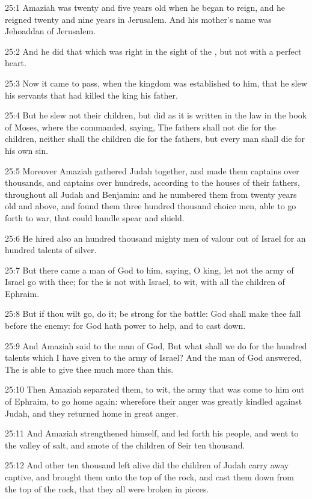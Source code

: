 25:1 Amaziah was twenty and five years old when he began to reign, and
he reigned twenty and nine years in Jerusalem. And his mother's name
was Jehoaddan of Jerusalem.

25:2 And he did that which was right in the sight of the \LORD, but not
with a perfect heart.

25:3 Now it came to pass, when the kingdom was established to him,
that he slew his servants that had killed the king his father.

25:4 But he slew not their children, but did as it is written in the
law in the book of Moses, where the \LORD commanded, saying, The
fathers shall not die for the children, neither shall the children die
for the fathers, but every man shall die for his own sin.

25:5 Moreover Amaziah gathered Judah together, and made them captains
over thousands, and captains over hundreds, according to the houses of
their fathers, throughout all Judah and Benjamin: and he numbered them
from twenty years old and above, and found them three hundred thousand
choice men, able to go forth to war, that could handle spear and
shield.

25:6 He hired also an hundred thousand mighty men of valour out of
Israel for an hundred talents of silver.

25:7 But there came a man of God to him, saying, O king, let not the
army of Israel go with thee; for the \LORD is not with Israel, to wit,
with all the children of Ephraim.

25:8 But if thou wilt go, do it; be strong for the battle: God shall
make thee fall before the enemy: for God hath power to help, and to
cast down.

25:9 And Amaziah said to the man of God, But what shall we do for the
hundred talents which I have given to the army of Israel? And the man
of God answered, The \LORD is able to give thee much more than this.

25:10 Then Amaziah separated them, to wit, the army that was come to
him out of Ephraim, to go home again: wherefore their anger was
greatly kindled against Judah, and they returned home in great anger.

25:11 And Amaziah strengthened himself, and led forth his people, and
went to the valley of salt, and smote of the children of Seir ten
thousand.

25:12 And other ten thousand left alive did the children of Judah
carry away captive, and brought them unto the top of the rock, and
cast them down from the top of the rock, that they all were broken in
pieces.

